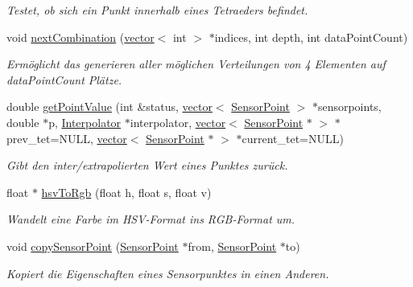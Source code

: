 \begin{DoxyCompactItemize}
\begin{DoxyCompactList}\small\item\em Testet, ob sich ein Punkt innerhalb eines Tetraeders befindet. \end{DoxyCompactList}\item 
void \hyperlink{namespaceUtils_af4ba26e928c7cef5269c51bfac49d547}{next\-Combination} (\hyperlink{classstd_1_1vector}{vector}$<$ int $>$ $\ast$indices, int depth, int data\-Point\-Count)
\begin{DoxyCompactList}\small\item\em Ermöglicht das generieren aller möglichen Verteilungen von 4 Elementen auf data\-Point\-Count Plätze. \end{DoxyCompactList}\item 
double \hyperlink{namespaceUtils_a6a0ae18a42e2d206bc1b43da27820fe2}{get\-Point\-Value} (int \&status, \hyperlink{classstd_1_1vector}{vector}$<$ \hyperlink{structUtils_1_1SensorPoint}{Sensor\-Point} $>$ $\ast$sensorpoints, double $\ast$p, \hyperlink{classInterpolator}{Interpolator} $\ast$interpolator, \hyperlink{classstd_1_1vector}{vector}$<$ \hyperlink{structUtils_1_1SensorPoint}{Sensor\-Point} $\ast$ $>$ $\ast$prev\-\_\-tet=N\-U\-L\-L, \hyperlink{classstd_1_1vector}{vector}$<$ \hyperlink{structUtils_1_1SensorPoint}{Sensor\-Point} $\ast$ $>$ $\ast$current\-\_\-tet=N\-U\-L\-L)
\begin{DoxyCompactList}\small\item\em Gibt den inter/extrapolierten Wert eines Punktes zurück. \end{DoxyCompactList}\item 
float $\ast$ \hyperlink{namespaceUtils_a5d6523eb946892eee52c9c74efd016de}{hsv\-To\-Rgb} (float h, float s, float v)
\begin{DoxyCompactList}\small\item\em Wandelt eine Farbe im H\-S\-V-\/\-Format ins R\-G\-B-\/\-Format um. \end{DoxyCompactList}\item 
void \hyperlink{namespaceUtils_adc0438a85ca31977c95f5d27090d5346}{copy\-Sensor\-Point} (\hyperlink{structUtils_1_1SensorPoint}{Sensor\-Point} $\ast$from, \hyperlink{structUtils_1_1SensorPoint}{Sensor\-Point} $\ast$to)
\begin{DoxyCompactList}\small\item\em Kopiert die Eigenschaften eines Sensorpunktes in einen Anderen. \end{DoxyCompactList}\end{DoxyCompactItemize}


